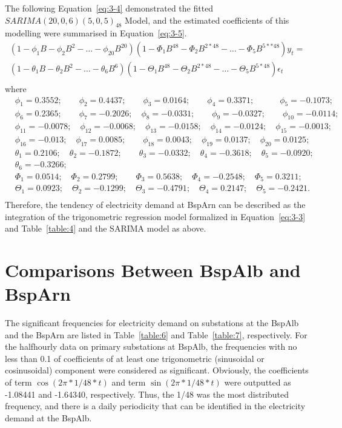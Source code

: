 \documentclass[12pt,msc]{uom_eee_dissertation_casson}
\newcommand{\tabref}[1]{Table~\ref{#1}}
\newcommand{\eqnref}[1]{Equation~\eqref{#1}}
\begin{document}
The following \eqnref{eq:3-4} demonstrated the fitted $SARIMA(20,0,6)(5,0,5)_{48}$ Model, and the estimated coefficients of this modelling were summarised in \eqnref{eq:3-5}.
\begin{equation}
\label{eq:3-4}
\begin{aligned}
(1-\phi_{1}B-\phi_{2}B^{2}-\dots-\phi_{20}B^{20})(1-\Phi_{1}B^{48}-\Phi_{2}B^{2*48}-\dots -\Phi_{5}B^{5**48})y_{t}=\\
(1-\theta_{1}B-\theta_{2}B^{2}-\dots-\theta_{6}B^{6})(1-\Theta_{1}B^{48}-\Theta_{2}B^{2*48}-\dots-\Theta_{5}B^{5*48})\epsilon_{t}\\
\end{aligned}
\end{equation}
where
\begin{equation}
\label{eq:3-5}
\begin{aligned}
&\phi_{1}=0.3552 ;\qquad\phi_{2}=0.4437 ; \qquad\phi_{3}=0.0164 ;  \qquad\phi_{4}=0.3371 ; \qquad \quad\phi_{5}=-0.1073 ; \\
&\phi_{6}=0.2365 ; \qquad\phi_{7}=-0.2026 ;\quad \phi_{8}= -0.0331;\qquad\phi_{9}=-0.0327 ;\qquad\phi_{10}=-0.0114 ;\\
&\phi_{11}=-0.0078;\quad \phi_{12}=-0.0068;\quad\phi_{13}= -0.0158 ;\quad\phi_{14}=-0.0124 ;\quad\phi_{15}=-0.0013 ;\\
&\phi_{16}=-0.013; \quad\phi_{17}=0.0085; \qquad\phi_{18}=0.0043; \quad\phi_{19}=0.0137;  \quad\phi_{20}=0.0125;\\
&\theta_{1}=0.2106; \quad\theta_{2}=-0.1872; \quad\quad\theta_{3}=-0.0332;\quad\theta_{4}=-0.3618; \quad\theta_{5}=-0.0920;\\ &\theta_{6}=-0.3266;\\
&\Phi_{1}=0.0514 ;  \quad\Phi_{2}=0.2799;  \qquad\Phi_{3}=0.5638;  \quad\Phi_{4}=-0.2548;  \quad\Phi_{5}=0.3211;\\
&\Theta_{1}=0.0923; \quad\Theta_
{2}=-0.1299;  \quad\Theta_{3}=-0.4791;  \quad\Theta_{4}=0.2147 ; \quad\Theta_{5}=-0.2421 .\\
\end{aligned}
\end{equation}
Therefore, the tendency of electricity demand at BspArn can be described as the integration of the trigonometric regression model formalized in \eqnref{eq:3-3} and \tabref{table:4} and the SARIMA model as above.

\section{Comparisons Between BspAlb and BspArn}
\label{sec:comparison}
The significant frequencies for electricity demand on substations at the BspAlb and the BspArn are listed in \tabref{table:6} and \tabref{table:7}, respectively. For the halfhourly data on primary substations at BspAlb, the frequencies with no less than 0.1 of coefficients of at least one trigonometric (sinusoidal or cosinusoidal) component were considered as significant. Obviously, the coefficients of term $\cos(2\pi *1/48*t)$ and term $\sin(2\pi *1/48*t)$ were outputted as -1.08441 and -1.64340, respectively. Thus, the 1/48 was the most distributed frequency, and there is a daily periodicity that can be identified in the electricity demand at the BspAlb.
\end{document}
